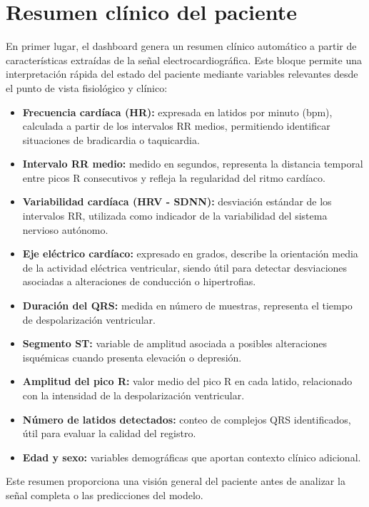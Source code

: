 \documentclass[12pt,a4paper,twoside]{book}
\begin{document}
\section{Resumen clínico del paciente}

En primer lugar, el dashboard genera un resumen clínico automático a partir de características extraídas de la señal electrocardiográfica. 
Este bloque permite una interpretación rápida del estado del paciente mediante variables relevantes desde el punto de vista fisiológico y clínico:

\begin{itemize}
    \item \textbf{Frecuencia cardíaca (HR):} expresada en latidos por minuto (bpm), calculada a partir de los intervalos RR medios, permitiendo identificar situaciones de bradicardia o taquicardia.
    \item \textbf{Intervalo RR medio:} medido en segundos, representa la distancia temporal entre picos R consecutivos y refleja la regularidad del ritmo cardíaco.
    \item \textbf{Variabilidad cardíaca (HRV - SDNN):} desviación estándar de los intervalos RR, utilizada como indicador de la variabilidad del sistema nervioso autónomo.
    \item \textbf{Eje eléctrico cardíaco:} expresado en grados, describe la orientación media de la actividad eléctrica ventricular, siendo útil para detectar desviaciones asociadas a alteraciones de conducción o hipertrofias.
    \item \textbf{Duración del QRS:} medida en número de muestras, representa el tiempo de despolarización ventricular.
    \item \textbf{Segmento ST:} variable de amplitud asociada a posibles alteraciones isquémicas cuando presenta elevación o depresión.
    \item \textbf{Amplitud del pico R:} valor medio del pico R en cada latido, relacionado con la intensidad de la despolarización ventricular.
    \item \textbf{Número de latidos detectados:} conteo de complejos QRS identificados, útil para evaluar la calidad del registro.
    \item \textbf{Edad y sexo:} variables demográficas que aportan contexto clínico adicional.
\end{itemize}

Este resumen proporciona una visión general del paciente antes de analizar la señal completa o las predicciones del modelo.
\end{document}
